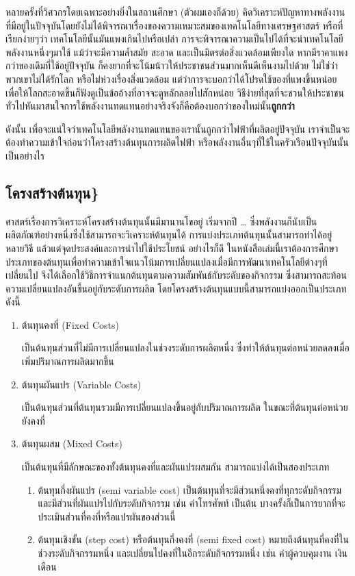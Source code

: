 \documentclass[11pt]{article}
\begin{document}
หลายครั้งที่วิศวกรโดยเฉพาะอย่างยิ่งในสถานศึกษา (ตัวผมเองก็ด้วย) คิดวิเคราะห์ปัญหาทางพลังงานที่มีอยู่ในปัจจุบันโดยยังไม่ได้พิจารณาเรื่องของความเหมาะสมของเทคโนโลยีทางเศรษฐศาสตร์ หรือที่เรียกง่ายๆว่า เทคโนโลยีนั้นมันแพงเกินไปหรือเปล่า การจะพิจารณาความเป็นไปได้ที่จะนำเทคโนโลยีพลังงานหนึ่งๆมาใช้ แม้ว่าจะมีความล้ำสมัย สะอาด และเป็นมิตรต่อสิ่งแวดล้อมเพียงใด หากมีราคาแพงกว่าของเดิมที่ใช้อยู่ปัจจุบัน ก็คงยากที่จะโน้มน้าวให้ประชาชนส่วนมากเห็นดีเห็นงามไปด้วย ไม่ใช่ว่าพวกเขาไม่ได้รักโลก หรือไม่ห่วงเรื่องสิ่งแวดล้อม แต่ว่าการจะบอกว่าได้โปรดใช้ของที่แพงขึ้นหน่อยเพื่อให้โลกสะอาดขึ้นก็ฟังดูเป็นข้ออ้างที่อาจจะดูหลักลอยไปสักหน่อย วิธีง่ายที่สุดที่จะชวนให้ประชาชนทั่วไปหันมาสนใจการใช้พลังงานทดแทนอย่างจริงจังก็คือต้องบอกว่าของใหม่นั้น\textbf{ถูกกว่า}

ดังนั้น เพื่อจะแน่ใจว่าเทคโนโลยีพลังงานทดแทนของเรานั้นถูกกว่าไฟฟ้าที่ผลิตอยู่ปัจจุบัน เราจำเป็นจะต้องทำความเข้าใจก่อนว่าโครงสร้างต้นทุนการผลิตไฟฟ้า หรือพลังงานอื่นๆที่ใช้ในครัวเรือนปัจจุบันนั้นเป็นอย่างไร

\subsection{โครงสร้างต้นทุน\}}
\label{sec:org156caa2}

ศาสตร์เรื่องการวิเคราะห์โครงสร้างต้นทุนนั้นมีมานานโขอยู่ เริ่มจากปี \ldots{} ซึ่งพลังงานก็นับเป็นผลิตภัณฑ์อย่างหนึ่งซึ่งใช้สามารถจะวิเคราะห์ต้นทุนได้ การแบ่งประเภทต้นทุนนั้นสามารถทำได้อยู่หลายวิธี แล้วแต่จุดประสงค์และการนำไปใช้ประโยชน์ อย่างไรก็ดี ในหนังสือเล่มนี้เราต้องการศึกษาประเภทของต้นทุนเพื่อทำความเข้าใจแนวโน้มการเปลี่ยนแปลงเมื่อมีการพัฒนาเทคโนโลยีต่างๆที่เปลี่ยนไป จึงได้เลือกใช้วิธีการจำแนกต้นทุนตามความสัมพันธ์กับระดับของกิจกรรม ซึ่งสามารถสะท้อนความเปลี่ยนแปลงอันขึ้นอยู่กับระดับการผลิต โดยโครงสร้างต้นทุนแบบนี้สามารถแบ่งออกเป็นประเภทดังนี้

\begin{enumerate}
\item ต้นทุนคงที่ (Fixed Costs)

  เป็นต้นทุนส่วนที่ไม่มีการเปลี่ยนแปลงในช่วงระดับการผลิตหนึ่ง ซึ่งทำให้ต้นทุนต่อหน่วยลดลงเมื่อเพิ่มปริมาณการผลิตมากขึ้น
\item ต้นทุนผันแปร (Variable Costs)

  เป็นต้นทุนส่วนที่ต้นทุนรวมมีการเปลี่ยนแปลงขึ้นอยู่กับปริมาณการผลิต ในขณะที่ต้นทุนต่อหน่วยยังคงที่

\item ต้นทุนผสม (Mixed Costs)

  เป็นต้นทุนที่มีลักษณะของทั้งต้นทุนคงที่และผันแปรผสมกัน สามารถแบ่งได้เป็นสองประเภท

  \begin{enumerate}
  \item ต้นทุนกึ่งผันแปร (semi variable cost) เป็นต้นทุนที่จะมีส่วนหนึ่งคงที่ทุกระดับกิจกรรม และมีส่วนที่ผันแปรไปกับระดับกิจกรรม เช่น ค่าโทรศัพท์ เป็นต้น บางครั้งก็เป็นการยากที่จะประเมินส่วนที่คงที่หรือแปรผันของส่วนนี้
        \item ต้นทุนเชิงขั้น (step cost) หรือต้นทุนกึ่งคงที่ (semi fixed cost) หมายถึงต้นทุนที่คงที่ในช่วงระดับกิจกรรมหนึ่ง และเปลี่ยนไปคงที่ในอีกระดับกิจกรรมหนึ่ง เช่น ค่าผู้ควบคุมงาน เงินเดือน
    \end{enumerate}
\end{enumerate}
\end{document}
